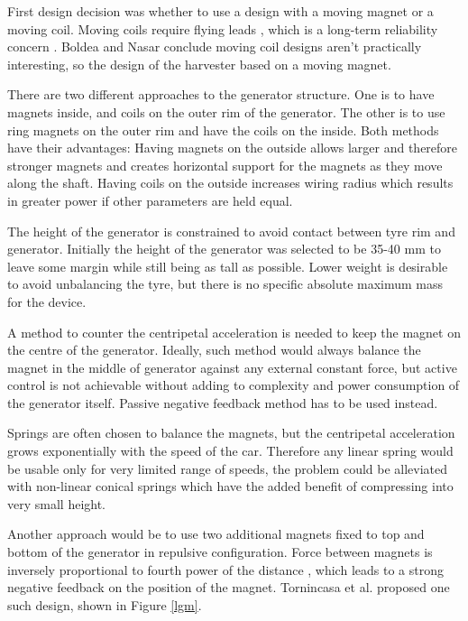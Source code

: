 First design decision was whether to use a design with a moving magnet or a moving coil. Moving coils require flying leads  \cite{Jacob2011},  which is a long-term reliability concern  \cite{Boldea1999}.  Boldea and Nasar \cite[p. 203]{Boldea1999a} conclude moving coil designs aren't practically interesting, so the design of the harvester based on a moving magnet.

There are two different approaches to the generator structure. One is to have magnets inside, and coils on the outer rim of the generator. The other is to use ring magnets on the outer rim and have the coils on the inside. Both methods have their advantages: Having magnets on the outside allows larger and therefore stronger magnets and creates horizontal support for the magnets as they move along the shaft. Having coils on the outside increases wiring radius which results in greater power if other parameters are held equal. 

The height of the generator is constrained to avoid contact between tyre rim and generator. Initially the height of the generator was selected to be 35-40 mm to leave some margin while still being as tall as possible. Lower weight is desirable to avoid unbalancing the tyre, but there is no specific absolute maximum mass for the device. 

A method to counter the centripetal acceleration is needed to keep the magnet on the centre of the generator. Ideally, such method would always balance the magnet in the middle of generator against any external constant force, but active control is not achievable without adding to complexity and power consumption of the generator itself. Passive negative feedback method has to be used instead. 

Springs are often chosen to balance the magnets, but the centripetal acceleration grows exponentially with the speed of the car. Therefore any linear spring would be usable only for very limited range of speeds, the problem could be alleviated with non-linear conical springs which have the added benefit of compressing into very small height.

Another approach would be to use two additional magnets fixed to top and bottom of the generator in repulsive configuration. Force between magnets is inversely proportional to fourth power of the distance \cite{Amrani2015}, which leads to a strong negative feedback on the position of the magnet. Tornincasa et al. \cite{Tornincasa2012} proposed one such design, shown in Figure \ref{lgm}.

